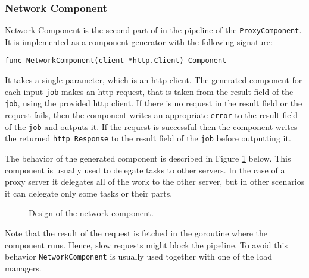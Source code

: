 \subsubsection{Network Component}
Network Component is the second part of in the pipeline of the 
\texttt{ProxyComponent}. It is implemented as a component generator 
with the following signature:
\begin{lstlisting}
func NetworkComponent(client *http.Client) Component
\end{lstlisting}
It takes a single parameter, which is an http client.
The generated component for each input \texttt{job} makes an http request,
that is taken from the result field of the \texttt{job}, using the 
provided http client.
If there is no request in the result field or the request fails, then
the component writes an appropriate \texttt{error} to the result field of the
\texttt{job} and outputs it. If the request is successful then 
the component writes the returned \texttt{http Response} to the 
result field of the \texttt{job} before outputting it.

The behavior of the generated component is described in 
Figure \ref{fig:networkComp} below. This component is usually used
to delegate tasks to other servers. In the case of a proxy server
it delegates all of the work to the other server, but in other scenarios
it can delegate only some tasks or their parts.
\begin{figure}[h]
\centering
{}
\caption[scale=1.0]{Design of the network component.}
\label{fig:networkComp}
\end{figure}

Note that the result of the request is fetched in the goroutine where the
component runs. Hence, slow requests might block the pipeline. To avoid
this behavior \texttt{NetworkComponent} is usually used together with one
of the load managers. 

